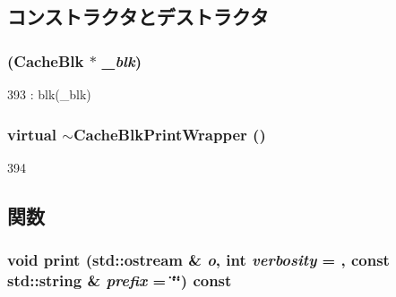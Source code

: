 \subsection{コンストラクタとデストラクタ}
\hypertarget{classCacheBlkPrintWrapper_a4b5ab8f57a3beda7935f1549b97ed4ee}{
\subsubsection[{CacheBlkPrintWrapper}]{ ({\bf CacheBlk} $\ast$ {\em \_\-blk})}}
\label{classCacheBlkPrintWrapper_a4b5ab8f57a3beda7935f1549b97ed4ee}



\begin{DoxyCode}
393 : blk(_blk) {}
\end{DoxyCode}
\hypertarget{classCacheBlkPrintWrapper_a3d965b4918362110eb2a8a6a3e348bf9}{
\subsubsection[{$\sim$CacheBlkPrintWrapper}]{\setlength{\rightskip}{0pt plus 5cm}virtual $\sim${\bf CacheBlkPrintWrapper} ()}}
\label{classCacheBlkPrintWrapper_a3d965b4918362110eb2a8a6a3e348bf9}



\begin{DoxyCode}
394 {}
\end{DoxyCode}


\subsection{関数}
\hypertarget{classCacheBlkPrintWrapper_ae31e5ec0b459f751b386d17dd75855d1}{
\subsubsection[{print}]{\setlength{\rightskip}{0pt plus 5cm}void print (std::ostream \& {\em o}, \/  int {\em verbosity} = {}, \/  const std::string \& {\em prefix} = {\ttfamily \char`\"{}\char`\"{}}) const}}
\label{classCacheBlkPrintWrapper_ae31e5ec0b459f751b386d17dd75855d1}


